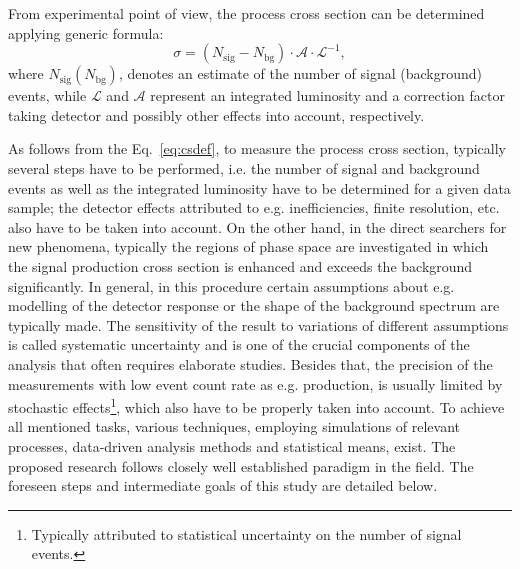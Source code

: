 \textcolor{\mycolor}{
From experimental point of view, the process cross section can be determined applying generic formula:
\begin{equation}
\sigma = \left(N_{\mathrm{sig}}-N_{\mathrm{bg}}\right)\cdot \mathcal{A} \cdot \mathcal{L}^{-1},
\label{eq:csdef}
\end{equation}
where $N_{\mathrm{sig}}\left(N_{\mathrm{bg}}\right)$, denotes an estimate of the number of signal (background) events, while $\mathcal{L}$ and $\mathcal{A}$ represent an integrated luminosity and a correction factor taking detector and possibly other effects into account, respectively. }

\textcolor{\mycolor}{
As follows from the Eq.~\eqref{eq:csdef}, to measure the process cross section, typically several steps have to be performed, i.e. the number of signal and background events as well as the integrated luminosity have to be determined for a given data sample; the detector effects attributed to e.g. inefficiencies, finite resolution, etc. also have to be taken into account. On the other hand, in the direct searchers for new phenomena, typically the regions of phase space are investigated in which the signal production cross section is enhanced and exceeds the background significantly. In general, in this procedure certain assumptions about e.g. modelling of the detector response or the shape of the background spectrum are typically made. The sensitivity of the result to variations of different assumptions is called systematic uncertainty and is one of the crucial components of the analysis that often requires elaborate studies. Besides that, the precision of the measurements with low event count rate as e.g. \fourtop production, is usually limited by stochastic effects\footnote{Typically attributed to statistical uncertainty on the number of signal events.}, which also have to be properly taken into account. To achieve all mentioned tasks, various techniques, employing simulations of relevant processes, data-driven analysis methods and statistical means, exist. The proposed research follows closely well established paradigm in the field. The foreseen steps and intermediate goals of this study are detailed below.}

